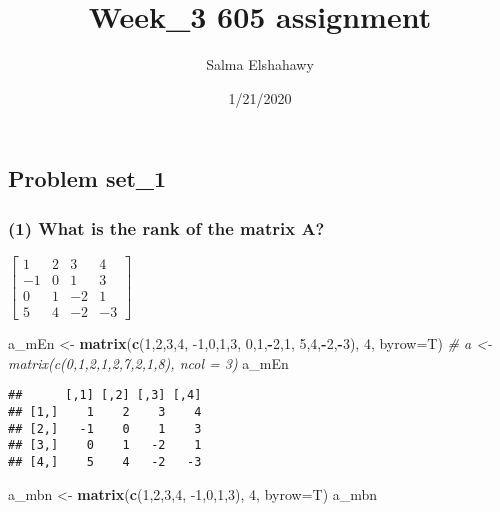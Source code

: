 \documentclass[]{article}
\title{Week\_3 605 assignment}
\author{Salma Elshahawy}
\date{1/21/2020}
\newenvironment{Shaded}{\begin{snugshade}}{\end{snugshade}}
\newcommand{\CommentTok}[1]{\textcolor[rgb]{0.56,0.35,0.01}{\textit{#1}}}
\newcommand{\DataTypeTok}[1]{\textcolor[rgb]{0.13,0.29,0.53}{#1}}
\newcommand{\DecValTok}[1]{\textcolor[rgb]{0.00,0.00,0.81}{#1}}
\newcommand{\KeywordTok}[1]{\textcolor[rgb]{0.13,0.29,0.53}{\textbf{#1}}}
\newcommand{\NormalTok}[1]{#1}
\newcommand{\OperatorTok}[1]{\textcolor[rgb]{0.81,0.36,0.00}{\textbf{#1}}}
\newcommand{\StringTok}[1]{\textcolor[rgb]{0.31,0.60,0.02}{#1}}
\begin{document}
\maketitle

\hypertarget{problem-set_1}{%
\subsection{Problem set\_1}\label{problem-set_1}}

\hypertarget{what-is-the-rank-of-the-matrix-a}{%
\subsubsection{(1) What is the rank of the matrix
A?}\label{what-is-the-rank-of-the-matrix-a}}

\(\begin{bmatrix} 1 & 2 & 3 & 4 \\ -1 & 0 & 1 & 3 \\ 0 & 1 & -2 & 1 \\ 5 & 4 & -2 & -3 \end{bmatrix}\)

\begin{Shaded}
\begin{Highlighting}[]
\NormalTok{a_mEn <-}\StringTok{ }\KeywordTok{matrix}\NormalTok{(}\KeywordTok{c}\NormalTok{(}\DecValTok{1}\NormalTok{,}\DecValTok{2}\NormalTok{,}\DecValTok{3}\NormalTok{,}\DecValTok{4}\NormalTok{,}
              \DecValTok{-1}\NormalTok{,}\DecValTok{0}\NormalTok{,}\DecValTok{1}\NormalTok{,}\DecValTok{3}\NormalTok{,}
              \DecValTok{0}\NormalTok{,}\DecValTok{1}\NormalTok{,}\OperatorTok{-}\DecValTok{2}\NormalTok{,}\DecValTok{1}\NormalTok{,}
              \DecValTok{5}\NormalTok{,}\DecValTok{4}\NormalTok{,}\OperatorTok{-}\DecValTok{2}\NormalTok{,}\OperatorTok{-}\DecValTok{3}\NormalTok{), }\DecValTok{4}\NormalTok{, }\DataTypeTok{byrow=}\NormalTok{T)}
\CommentTok{# a <- matrix(c(0,1,2,1,2,7,2,1,8), ncol = 3)}
\NormalTok{a_mEn}
\end{Highlighting}
\end{Shaded}

\begin{verbatim}
##      [,1] [,2] [,3] [,4]
## [1,]    1    2    3    4
## [2,]   -1    0    1    3
## [3,]    0    1   -2    1
## [4,]    5    4   -2   -3
\end{verbatim}

\begin{Shaded}
\begin{Highlighting}[]
\NormalTok{a_mbn <-}\StringTok{ }\KeywordTok{matrix}\NormalTok{(}\KeywordTok{c}\NormalTok{(}\DecValTok{1}\NormalTok{,}\DecValTok{2}\NormalTok{,}\DecValTok{3}\NormalTok{,}\DecValTok{4}\NormalTok{,}
              \DecValTok{-1}\NormalTok{,}\DecValTok{0}\NormalTok{,}\DecValTok{1}\NormalTok{,}\DecValTok{3}\NormalTok{), }\DecValTok{4}\NormalTok{, }\DataTypeTok{byrow=}\NormalTok{T)}
\NormalTok{a_mbn}
\end{Highlighting}
\end{Shaded}
\end{document}
